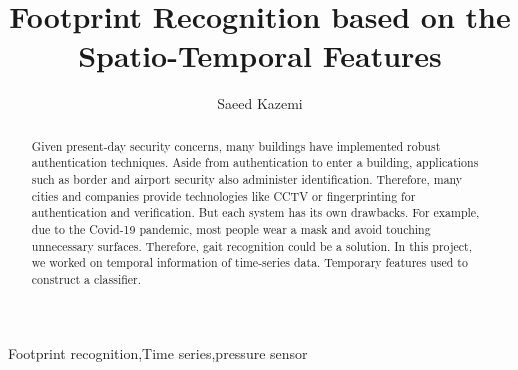 \begin{frontmatter}
\title{\Huge  Footprint Recognition based on the\\ Spatio-Temporal Features }


\author{Saeed Kazemi}
\address{University of New Brunswick}


\begin{abstract}
Given present-day security concerns, many buildings have implemented robust authentication techniques. Aside from authentication to enter a building, applications such as border and airport security also administer identification. Therefore, many cities and companies provide technologies like CCTV or fingerprinting for authentication and verification. But each system has its own drawbacks. For example, due to the Covid-19 pandemic, most people wear a mask and avoid touching unnecessary surfaces. Therefore, gait recognition could be a solution. In this project, we worked on temporal information of time-series data. Temporary features used to construct a classifier.


\end{abstract}

\begin{keyword}
Footprint recognition\sep Time series\sep pressure sensor
\end{keyword}

\end{frontmatter}
